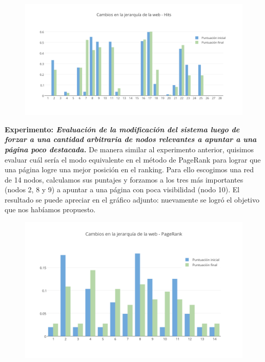\documentclass[a4paper]{article}
\begin{document}
\begin{figure}[h!]
  \begin{center}
	\includegraphics[scale=0.66]{imagenes/cambioshits.png}
	\caption{}
	\label{cambioshits}
  \end{center}
\end{figure}
\newpage
\textbf{Experimento: \itshape{Evaluación de la modificación del sistema luego de forzar a una cantidad arbitraria de nodos relevantes a apuntar a una página poco destacada.}}
De manera similar al experimento anterior, quisimos evaluar cuál sería el modo equivalente en el método de PageRank para lograr que una página logre una mejor posición en el ranking.
Para ello escogimos una red de 14 nodos, calculamos sus puntajes y forzamos a los tres más importantes (nodos 2, 8 y 9) a apuntar a una página con poca visibilidad (nodo 10). El resultado se puede apreciar en el gráfico adjunto: nuevamente se logró el objetivo que nos habíamos propuesto.

\begin{figure}[h!]
  \begin{center}
	\includegraphics[scale=0.66]{imagenes/cambiospagerank.png}
	\caption{}
	\label{cambiospagerank}
  \end{center}
\end{figure}
\end{document}
